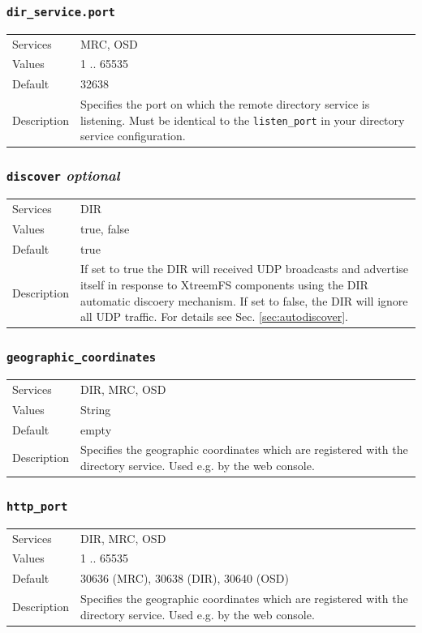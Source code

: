 \documentclass[a4paper,10pt]{book}
\begin{document}
\subsubsection{\texttt{dir\_service.port}}
\begin{tabular}{lp{10cm}}
 Services & MRC, OSD\\
 Values   & 1 .. 65535 \\
 Default  & 32638 \\
 Description & Specifies the port on which the remote directory service is listening. Must be identical to the \texttt{listen\_port} in your directory service configuration.
\end{tabular}

\subsubsection{\texttt{discover} \textit{optional}}
\begin{tabular}{lp{10cm}}
 Services & DIR\\
 Values   & true, false \\
 Default  & true \\
 Description & If set to true the DIR will received UDP broadcasts and advertise itself in response to XtreemFS components using the DIR automatic discoery mechanism. If set to false, the DIR will ignore all UDP traffic. For details see Sec. \ref{sec:autodiscover}.
\end{tabular}

\subsubsection{\texttt{geographic\_coordinates}}
\begin{tabular}{lp{10cm}}
 Services & DIR, MRC, OSD\\
 Values   & String \\
 Default  & empty \\
 Description & Specifies the geographic coordinates which are registered with the directory service. Used e.g. by the web console.
\end{tabular}

\subsubsection{\texttt{http\_port}}
\begin{tabular}{lp{10cm}}
 Services & DIR, MRC, OSD\\
 Values   & 1 .. 65535 \\
 Default  & 30636 (MRC), 30638 (DIR), 30640 (OSD)\\
 Description & Specifies the geographic coordinates which are registered with the directory service. Used e.g. by the web console.
\end{tabular}
\end{document}
